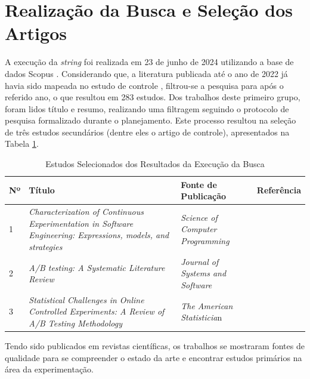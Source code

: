 \section{Realização da Busca e Seleção dos Artigos}

A execução da \textit{string} foi realizada em 23 de junho de 2024 utilizando a base de dados Scopus \cite{elsevier2022}. Considerando que, a literatura publicada até o ano de 2022 já havia sido mapeada no estudo de controle \cite{erthal_characterization_2023}, filtrou-se a pesquisa para após o referido ano, o que resultou em 283 estudos. Dos trabalhos deste primeiro grupo, foram lidos título e resumo, realizando uma filtragem seguindo o protocolo de pesquisa formalizado durante o planejamento. Este processo resultou na seleção de três estudos secundários (dentre eles o artigo de controle), apresentados na Tabela \ref{tab:resultados-busca}.

\begin{table}[h!]
    \caption{Estudos Selecionados dos Resultados da Execução da Busca}

    \begin{tabular}{|p{.5cm}|p{6cm}|p{6cm}|p{1.75cm}|}
        \hline
        Nº & Título & Fonte de Publicação & Referência \\ \hline
        1 & \textit{Characterization of Continuous Experimentation in Software Engineering: Expressions, models, and strategies} & \textit{Science of Computer Programming} & \cite{erthal_characterization_2023} \\ \hline
        2 & \textit{A/B testing: A Systematic Literature Review} & \textit{Journal of Systems and Software} & \cite{quin_b_2024} \\ \hline
        3 & \textit{Statistical Challenges in Online Controlled Experiments: A Review of A/B Testing Methodology} & \textit{The American Statisticia}n & \cite{larsen_statistical_2024} \\ \hline
    \end{tabular}
    
    \begin{center}
    \end{center}

    \label{tab:resultados-busca}
\end{table}

Tendo sido publicados em revistas científicas, os trabalhos se mostraram fontes de qualidade para se compreender o estado da arte e encontrar estudos primários na área da experimentação.

